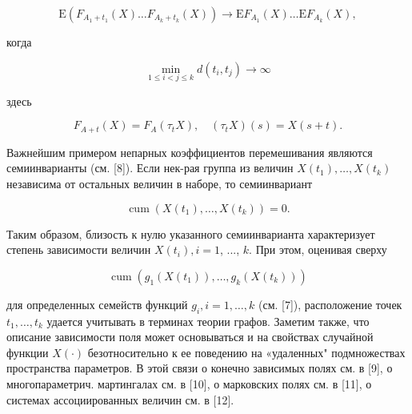\documentclass[10pt]{article}
\begin{document}
\[

\mathrm{E}\left(F_{A_{1}+t_{1}}(X) \ldots F_{A_{k}+t_{k}}(X)\right) \rightarrow \mathrm{E} F_{A_{1}}(X) \ldots \mathrm{E} F_{A_{k}}(X),

\]



когда



\[

\min _{1 \leqslant i<j \leqslant k} d\left(t_{i}, t_{j}\right) \rightarrow \infty

\]



здесь



\[

F_{A+t}(X)=F_{A}\left(\tau_{t} X\right), \quad\left(\tau_{t} X\right)(s)=X(s+t) .

\]



Важнейшим примером непарных коэффициентов перемешивания являются семиинварианты (см. [8]). Если нек-рая группа из величин $X\left(t_{1}\right), \ldots, X\left(t_{k}\right)$ независима от остальных величин в наборе, то семиинвариант



\[

\operatorname{cum}\left(X\left(t_{1}\right), \ldots, X\left(t_{k}\right)\right)=0 .

\]



Таким образом, близость к нулю указанного семиинварианта характеризует степень зависимости величин $X\left(t_{i}\right), i=1$, ..., $k$. При этом, оценивая сверху



\[

\operatorname{cum}\left(g_{1}\left(X\left(t_{1}\right)\right), \ldots, g_{k}\left(X\left(t_{k}\right)\right)\right)

\]



для определенных семейств функций $g_{i}, i=1, \ldots, k$ (см. [7]), расположение точек $t_{1}, \ldots, t_{k}$ удается учитывать в терминах теории графов. Заметим также, что описание зависимости поля может основываться и на свойствах случайной функции $X(\cdot)$ безотносительно к ее поведению на «удаленных" подмножествах пространства параметров. В этой связи о конечно зависимых полях см. в [9], о многопараметрич. мартингалах см. в [10], о марковских полях см. в [11], о системах ассоциированных величин см. в [12].
\end{document}
